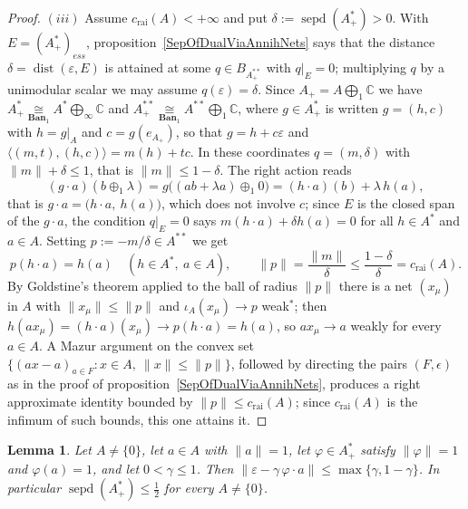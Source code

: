 \documentclass[11pt]{article}
\theoremstyle{plain}
\newtheorem{lemma}[theorem]{Lemma}
\theoremstyle{definition}
\newcommand{\isom}[1]{\mathrel{\mathop{\cong}\limits_{#1}}}
\DeclareMathOperator{\dist}{dist}
\DeclareMathOperator{\sepd}{sepd}
\newcommand{\crai}{c_{\mathrm{rai}}}
\begin{document}
\begin{proof}
$(iii)$ Assume $\crai(A)<+\infty$ and put $\delta:=\sepd(A_+^*)>0$. With
$E={(A_+^*)}_{ess}$, proposition~\ref{SepOfDualViaAnnihNets} says that the
distance $\delta=\dist(\varepsilon,E)$ is attained at some $q\in B_{A_+^{**}}$
with $q|_E=0$; multiplying $q$ by a unimodular scalar we may assume
$q(\varepsilon)=\delta$. Since $A_+=A\bigoplus_1\mathbb{C}$ we have
$A_+^*\isom{\mathbf{Ban}_1}A^*\bigoplus_\infty\mathbb{C}$ and
$A_+^{**}\isom{\mathbf{Ban}_1}A^{**}\bigoplus_1\mathbb{C}$, where $g\in A_+^*$ is
written $g=(h,c)$ with $h=g|_A$ and $c=g(e_{A_+})$, so that
$g=h+c\varepsilon$ and $\langle(m,t),(h,c)\rangle=m(h)+tc$. In these coordinates
$q=(m,\delta)$ with $\lVert m\rVert+\delta\leq 1$, that is
$\lVert m\rVert\leq 1-\delta$. The right action reads
\[
(g\cdot a)(b\oplus_1\lambda)=g \bigl((ab+\lambda a)\oplus_1 0 \bigr)
=(h\cdot a)(b)+\lambda\,h(a),
\]
that is $g\cdot a=\bigl(h\cdot a,\ h(a)\bigr)$, which does not involve $c$; since
$E$ is the closed span of the $g\cdot a$, the condition $q|_E=0$ says
$m(h\cdot a)+\delta h(a)=0$ for all $h\in A^*$ and $a\in A$. Setting
$p:=-m/\delta\in A^{**}$ we get
\[
p(h\cdot a)=h(a)\quad(h\in A^*,\ a\in A),
\qquad
\lVert p\rVert=\frac{\lVert m\rVert}{\delta}\leq\frac{1-\delta}{\delta}=\crai(A).
\]
By Goldstine's theorem applied to the ball of radius $\lVert p\rVert$ there is a
net ${(x_\mu)}$ in $A$ with $\lVert x_\mu\rVert\leq\lVert p\rVert$ and
$\iota_A(x_\mu)\to p$ weak${}^*$; then
$h(ax_\mu)=(h\cdot a)(x_\mu)\to p(h\cdot a)=h(a)$, so $ax_\mu\to a$ weakly for
every $a\in A$. A Mazur argument on the convex set
$ \{{(ax-a)}_{a\in F}:x\in A,\ \lVert x\rVert\leq\lVert p\rVert \}$, followed by
directing the pairs $(F,\epsilon)$ as in the proof of
proposition~\ref{SepOfDualViaAnnihNets}, produces a right approximate identity
bounded by $\lVert p\rVert\leq\crai(A)$; since $\crai(A)$ is the infimum of such
bounds, this one attains it.
\end{proof}

\begin{lemma}\label{AugmCharDistEstimate}
Let $A\neq \{0 \}$, let $a\in A$ with $\lVert a\rVert=1$, let
$\varphi\in A_+^*$ satisfy $\lVert\varphi\rVert=1$ and $\varphi(a)=1$, and let
$0<\gamma\leq 1$. Then
$\lVert\varepsilon-\gamma\,\varphi\cdot a\rVert\leq\max \{\gamma,1-\gamma \}$. In
particular $\sepd(A_+^*)\leq\tfrac{1}{2}$ for every $A\neq \{0 \}$.
\end{lemma}
\end{document}
